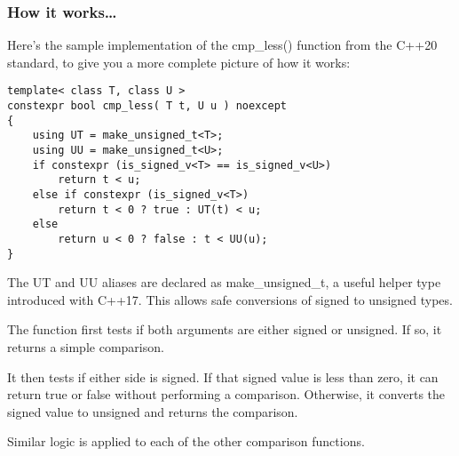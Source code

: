 \subsubsection{How it works…}

Here's the sample implementation of the cmp\_less() function from the C++20 standard, to give you a more complete picture of how it works:

\begin{lstlisting}[style=styleCXX]
template< class T, class U >
constexpr bool cmp_less( T t, U u ) noexcept
{
	using UT = make_unsigned_t<T>;
	using UU = make_unsigned_t<U>;
	if constexpr (is_signed_v<T> == is_signed_v<U>)
		return t < u;
	else if constexpr (is_signed_v<T>)
		return t < 0 ? true : UT(t) < u;
	else
		return u < 0 ? false : t < UU(u);
}
\end{lstlisting}

The UT and UU aliases are declared as make\_unsigned\_t, a useful helper type introduced with C++17. This allows safe conversions of signed to unsigned types.

The function first tests if both arguments are either signed or unsigned. If so, it returns a simple comparison.

It then tests if either side is signed. If that signed value is less than zero, it can return true or false without performing a comparison. Otherwise, it converts the signed value to unsigned and returns the comparison.

Similar logic is applied to each of the other comparison functions.















